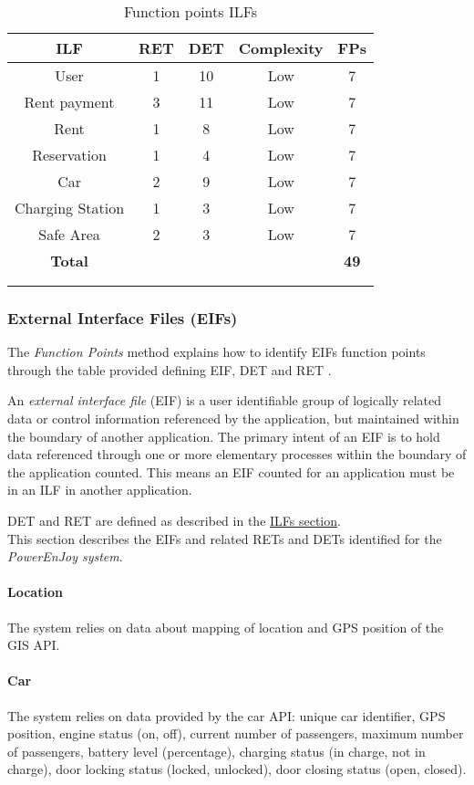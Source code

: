 \begin{longtable}{ccccc}
\toprule
\textbf{ILF}			&	RET	&	DET	&	Complexity  & \textbf{FPs}\\
\midrule
User			&	1	&	10		&	Low & 7 \\
Rent payment & 3 & 11 & Low & 7 \\
Rent & 1 & 8 & Low & 7 \\
Reservation & 1 & 4 & Low & 7 \\
Car & 2 & 9 & Low & 7\\
Charging Station & 1 & 3 & Low & 7 \\
Safe Area & 2 & 3 & Low & 7 \\
\midrule
\textbf{Total} & & & & \textbf{49}\\
\bottomrule \\
\caption{Function points ILFs}
\label{tbl:ilfFP}
\end{longtable}

\clearpage

\subsubsection{External Interface Files (EIFs)}
The \emph{Function Points} method explains how to identify EIFs function points through the table provided defining EIF, DET and RET \cite{FP}.

An \emph{external interface file} (EIF) is a user identifiable group of logically related data or control information referenced by the application, but maintained within the boundary of another application. The primary intent of an EIF is to hold data referenced through one or more elementary processes within the boundary of the application counted. This means an EIF counted for an application must be in an ILF in another application.

DET and RET are defined as described in the \hyperref[sec:ILFs]{ILFs section}.\\

This section describes the EIFs and related RETs and DETs identified for the \emph{PowerEnJoy system}.

\paragraph{Location} The system relies on data about mapping of location and GPS position of the GIS API.

\paragraph{Car} The system relies on data provided by the car API: unique car identifier, GPS position, engine status (on, off), current number of passengers, maximum number of passengers, battery level (percentage), charging status (in charge, not in charge), door locking status (locked, unlocked), door closing status (open, closed).

